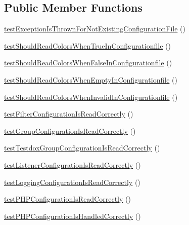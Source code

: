 \subsection*{Public Member Functions}
\begin{DoxyCompactItemize}
\item 
\mbox{\hyperlink{class_util___configuration_test_a60789badf2a769286c37173920472165}{test\+Exception\+Is\+Thrown\+For\+Not\+Existing\+Configuration\+File}} ()
\item 
\mbox{\hyperlink{class_util___configuration_test_a4f6863418c016a8646c595add5fe2117}{test\+Should\+Read\+Colors\+When\+True\+In\+Configurationfile}} ()
\item 
\mbox{\hyperlink{class_util___configuration_test_a2cd7b2c825f5f50628b0823f16ace6e4}{test\+Should\+Read\+Colors\+When\+False\+In\+Configurationfile}} ()
\item 
\mbox{\hyperlink{class_util___configuration_test_a1d32d014d0612e76fc528bd769514783}{test\+Should\+Read\+Colors\+When\+Empty\+In\+Configurationfile}} ()
\item 
\mbox{\hyperlink{class_util___configuration_test_a22270e8a0eed75c7c559b1b69c9e7c3e}{test\+Should\+Read\+Colors\+When\+Invalid\+In\+Configurationfile}} ()
\item 
\mbox{\hyperlink{class_util___configuration_test_a5cd8fd76f4c4226b60ce0672cd31d623}{test\+Filter\+Configuration\+Is\+Read\+Correctly}} ()
\item 
\mbox{\hyperlink{class_util___configuration_test_a596b0f7d0278bb33ae5d285451e58343}{test\+Group\+Configuration\+Is\+Read\+Correctly}} ()
\item 
\mbox{\hyperlink{class_util___configuration_test_a66c5b2829acdbd187877a794af9b97ee}{test\+Testdox\+Group\+Configuration\+Is\+Read\+Correctly}} ()
\item 
\mbox{\hyperlink{class_util___configuration_test_aca9ff60e247027f3e4c9f31c798d7992}{test\+Listener\+Configuration\+Is\+Read\+Correctly}} ()
\item 
\mbox{\hyperlink{class_util___configuration_test_acaa41b3ecd8c0f3117b798b67fb8fa07}{test\+Logging\+Configuration\+Is\+Read\+Correctly}} ()
\item 
\mbox{\hyperlink{class_util___configuration_test_aab1aba7331a759e73b0f2d60c48c9099}{test\+P\+H\+P\+Configuration\+Is\+Read\+Correctly}} ()
\item 
\mbox{\hyperlink{class_util___configuration_test_a261d1a1ce400e65e43e7dc9860c53ff2}{test\+P\+H\+P\+Configuration\+Is\+Handled\+Correctly}} ()
\item 

\end{DoxyCompactItemize}
